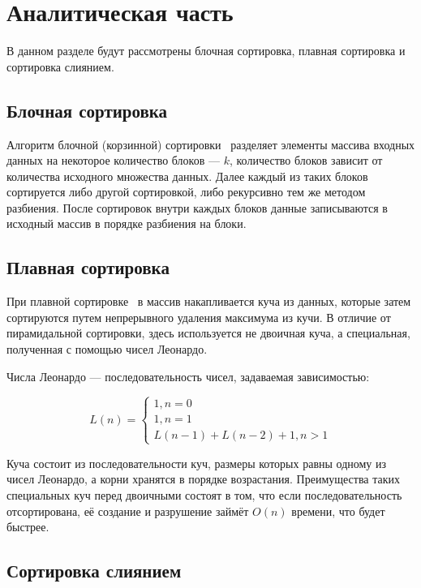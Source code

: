 \chapter{Аналитическая часть}
В данном разделе будут рассмотрены блочная сортировка, плавная сортировка и сортировка слиянием.

\section{Блочная сортировка}

Алгоритм блочной (корзинной) сортировки~\cite{bucket-sort} разделяет элементы массива входных данных на некоторое количество блоков --- $k$, количество блоков зависит от количества исходного множества данных. Далее каждый из таких блоков сортируется либо другой сортировкой, либо рекурсивно тем же методом разбиения. После сортировок внутри каждых блоков данные записываются в исходный массив в порядке разбиения на блоки.

\section{Плавная сортировка}

При плавной сортировке~\cite{smooth-sort} в массив накапливается куча из данных, которые затем сортируются путем непрерывного удаления максимума из кучи. В отличие от пирамидальной сортировки, здесь используется не двоичная куча, а специальная, полученная с помощью чисел Леонардо. 

Числа Леонардо --- последовательность чисел, задаваемая зависимостью:

\begin{equation}
	L(n) = \begin{cases}
		1, n = 0\\
		1, n = 1\\
		L(n-1) + L(n-2) + 1, n > 1
	\end{cases}
\end{equation}

Куча состоит из последовательности куч, размеры которых равны одному из чисел Леонардо, а корни хранятся в порядке возрастания. Преимущества таких специальных куч перед двоичными состоят в том, что если последовательность отсортирована, её создание и разрушение займёт $O(n)$ времени, что будет быстрее. 

\section{Сортировка слиянием}

